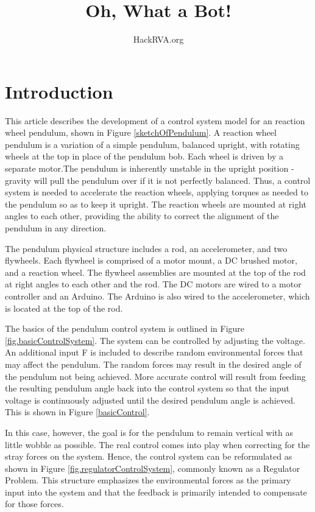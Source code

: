 \documentclass[12pt,letterpaper]{article}
\begin{document}
\title{Oh, What a Bot!}
\author{HackRVA.org}
\date{}
\maketitle



\section{Introduction}
This article describes the development of a control system model for an reaction wheel pendulum, shown in Figure \ref{sketchOfPendulum}.  A reaction wheel pendulum is a variation of a simple pendulum, balanced upright, with rotating wheels
at the top in place of the pendulum bob. Each wheel is driven by a separate motor.The pendulum is inherently unstable in the upright position - gravity will pull the pendulum over if it is not perfectly balanced.  Thus, a control system is needed to accelerate the reaction wheels, applying torques
as needed to the pendulum so as to keep it upright. The reaction wheels are mounted at right angles to each other, providing the ability to 
correct the alignment of the pendulum in any direction.

The pendulum physical structure includes a rod, an accelerometer, and two flywheels.  Each
flywheel is comprised of a motor mount, a DC brushed motor, and a reaction wheel.  The flywheel assemblies are mounted at
the top of the rod at right angles to each other and the rod.  The DC motors are wired to a motor controller and an Arduino.  The Arduino is also wired
to the accelerometer, which is located at the top of the rod.

The basics of the pendulum control system is outlined in Figure \ref{fig.basicControlSystem}.  The system
can be controlled by adjusting the voltage.  An additional input F is included to describe random environmental forces that may affect the pendulum.  The random forces may result in the desired angle of the pendulum not being achieved.  More accurate control will result from feeding the resulting pendulum angle back into the control system so that the input voltage is continuously adjusted until the desired pendulum angle is achieved.  This is shown in Figure \ref{basicControl}.

In this case, however, the goal is for the pendulum to remain vertical with as little wobble as possible.
The real control comes into play when correcting for the stray forces on the system.  Hence, the control
system can be reformulated as shown in Figure \ref{fig.regulatorControlSystem}, commonly known as
a Regulator Problem.  This structure emphasizes the environmental forces as the primary input into the
system and that the feedback is primarily intended to compensate for those forces.
\end{document}
